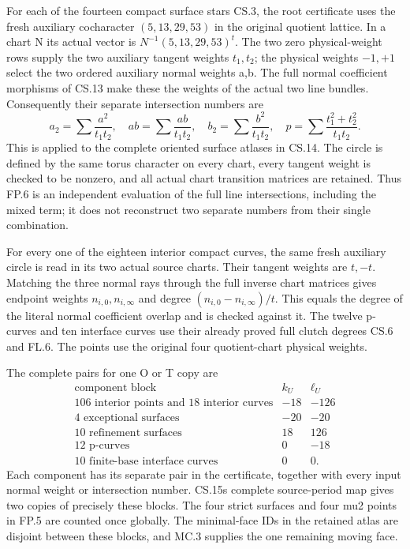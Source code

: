 For each of the fourteen compact surface stars CS.3,
the root certificate uses the fresh auxiliary
cocharacter \((5,13,29,53)\) in the original quotient
lattice. In a chart N its actual vector is
\(N^{-1}(5,13,29,53)^t\). The two zero physical-weight
rows supply the two auxiliary tangent weights
\(t_1,t_2\); the physical weights \(-1,+1\) select
the two ordered auxiliary normal weights a,b.
The full normal coefficient morphisms of CS.13
make these the weights of the actual two line
bundles. Consequently their separate intersection
numbers are
\[
 a_2=\sum\frac{a^2}{t_1t_2},\quad
 a b=\sum\frac{ab}{t_1t_2},\quad
 b_2=\sum\frac{b^2}{t_1t_2},\quad
 p=\sum\frac{t_1^2+t_2^2}{t_1t_2}.                     \tag{FP.6}
\]
This is applied to the complete oriented surface
atlases in CS.14. The circle is defined by the same
torus character on every chart, every tangent weight
is checked to be nonzero, and all actual chart
transition matrices are retained. Thus FP.6 is an
independent evaluation of the full line intersections,
including the mixed term; it does not reconstruct
two separate numbers from their single combination.

For every one of the eighteen interior compact
curves, the same fresh auxiliary circle is read in
its two actual source charts. Their tangent weights
are \(t,-t\). Matching the three normal rays through
the full inverse chart matrices gives endpoint
weights \(n_{i,0},n_{i,\infty}\) and degree
\((n_{i,0}-n_{i,\infty})/t\). This equals the degree
of the literal normal coefficient overlap and is
checked against it. The twelve p-curves and ten
interface curves use their already proved full
clutch degrees CS.6 and FL.6. The points use the
original four quotient-chart physical weights.

The complete pairs for one O or T copy are
\[
\begin{array}{c|rr}
 \text{component block}&k_U&\ell_U\\\hline
 106\text{ interior points and }18\text{ interior curves}&-18&-126\\
 4\text{ exceptional surfaces}&-20&-20\\
 10\text{ refinement surfaces}&18&126\\
 12\text{ p-curves}&0&-18\\
 10\text{ finite-base interface curves}&0&0.
\end{array}                                             \tag{FP.7}
\]
Each component has its separate pair in the certificate,
together with every input normal weight or intersection
number. CS.15\textquotesingle s complete source-period map gives two
copies of precisely these blocks. The four strict
surfaces and four mu2 points in FP.5 are counted once
globally. The minimal-face IDs in the retained atlas
are disjoint between these blocks, and MC.3 supplies
the one remaining moving face.

